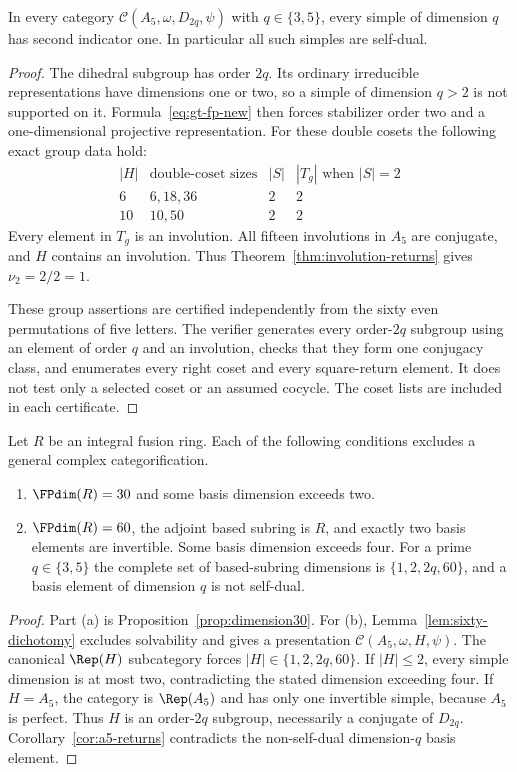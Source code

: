 \begin{corollary}\label{cor:a5-returns}
In every category $\mathcal C(A_5,\omega,D_{2q},\psi)$ with
$q\in\{3,5\}$, every simple of dimension $q$ has second indicator one.
In particular all such simples are self-dual.
\end{corollary}
\begin{proof}
The dihedral subgroup has order $2q$. Its ordinary irreducible
representations have dimensions one or two, so a simple of dimension
$q>2$ is not supported on it. Formula~\eqref{eq:gt-fp-new} then forces
stabilizer order two and a one-dimensional projective representation.
For these double cosets the following exact group data hold:
\[
\begin{array}{c|c|c|c}
 |H|&\text{double-coset sizes}&|S|&|T_g|\text{ when }|S|=2\\\hline
 6&6,18,36&2&2\\
 10&10,50&2&2
\end{array}
\]
Every element in $T_g$ is an involution. All fifteen involutions in $A_5$
are conjugate, and $H$ contains an involution. Thus
Theorem~\ref{thm:involution-returns} gives $\nu_2=2/2=1$.

These group assertions are certified independently from the sixty even
permutations of five letters. The verifier generates every order-$2q$
subgroup using an element of order $q$ and an involution, checks that they
form one conjugacy class, and enumerates every right coset and every
square-return element. It does not test only a selected coset or an
assumed cocycle. The coset lists are included in each certificate.
\end{proof}

\begin{theorem}\label{thm:small-morita}
Let $R$ be an integral fusion ring. Each of the following conditions
excludes a general complex categorification.
\begin{enumerate}[label=\textup{(\alph*)}]
\item $\FPdim(R)=30$ and some basis dimension exceeds two.
\item $\FPdim(R)=60$, the adjoint based subring is $R$, and exactly two
basis elements are invertible. Some basis dimension exceeds four.
For a prime $q\in\{3,5\}$ the complete set of based-subring dimensions is
$\{1,2,2q,60\}$, and a basis element of dimension $q$ is not self-dual.
\end{enumerate}
\end{theorem}
\begin{proof}
Part (a) is Proposition~\ref{prop:dimension30}.
For (b), Lemma~\ref{lem:sixty-dichotomy} excludes solvability and gives a
presentation $\mathcal C(A_5,\omega,H,\psi)$.
The canonical $\Rep(H)$ subcategory forces
$|H|\in\{1,2,2q,60\}$. If $|H|\leq2$, every simple dimension is at most
two, contradicting the stated dimension exceeding four. If $H=A_5$,
the category is $\Rep(A_5)$ and has only one invertible simple, because
$A_5$ is perfect. Thus $H$ is an order-$2q$ subgroup, necessarily a
conjugate of $D_{2q}$. Corollary~\ref{cor:a5-returns} contradicts the
non-self-dual dimension-$q$ basis element.
\end{proof}

